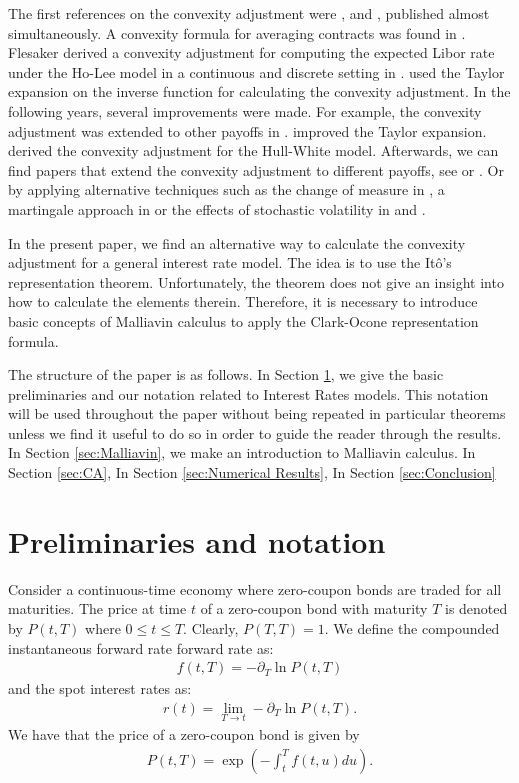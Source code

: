 \documentclass[a4paper,10pt]{article}
\newcommand{\1}{\mathbf{1}}
\begin{document}
The first references on the convexity adjustment were \cite{RitchkenS}, \cite{Flesaker} and \cite{BrothertonIben}, published almost simultaneously. A convexity formula for averaging contracts was found in \cite{RitchkenS}. Flesaker derived a convexity adjustment for computing the expected Libor rate under the Ho-Lee model in a continuous and discrete setting in \cite{Flesaker}. \cite{BrothertonIben} used the Taylor expansion on the inverse function for calculating the convexity adjustment. In the following years, several improvements were made. For example, the convexity adjustment was extended to other payoffs in \cite{Hull06}. \cite{Hart} improved the Taylor expansion. \cite{KirikosNovak} derived the convexity adjustment for the Hull-White model. Afterwards, we can find papers that extend the convexity adjustment to different payoffs, see \cite{Benhamou00WC} or \cite{Hagan03}. Or by applying alternative techniques such as the change of measure in \cite{Pelsser}, a martingale approach in \cite{Benhamou00} or the effects of stochastic volatility in \cite{PiterbargRenedo} and \cite{HaganWoodward20}.

In the present paper, we find an alternative way to calculate the convexity adjustment for a general interest rate model. The idea is to use the It\^o's representation theorem. Unfortunately, the theorem does not give an insight into how to calculate the elements therein. Therefore, it is necessary to introduce basic concepts of Malliavin calculus to apply the Clark-Ocone representation formula.


The structure of the paper is as follows. In Section \ref{sec:Notation}, we give the basic preliminaries and our notation related to Interest Rates models. This notation will be used throughout the paper without being repeated in particular theorems unless we find it useful to do so in order to guide the reader through the results. In Section \ref{sec:Malliavin}, we make an introduction to Malliavin calculus. In Section \ref{sec:CA}, In Section \ref{sec:Numerical Results}, In Section \ref{sec:Conclusion}


\section{Preliminaries and notation}\label{sec:Notation}
Consider a continuous-time economy where zero-coupon bonds are traded for all maturities. The price at time $t$ of a zero-coupon bond with maturity $T$ is denoted by $P(t,T)$ where $0\leq t \leq T$. Clearly, $P(T,T)=1$. We define the compounded instantaneous forward rate forward rate as:
\begin{eqnarray*}
f(t,T)= -\partial_{T}\ln P(t,T)
\end{eqnarray*}
and the spot interest rates as:
\begin{eqnarray*}
r(t)=\lim_{T\longrightarrow t} -\partial_{T}\ln P(t,T).
\end{eqnarray*}
We have that the price of a zero-coupon bond is given by
\begin{eqnarray*}
P(t,T)=\exp\left(-\int^{T}_{t} f(t,u) du\right).
\end{eqnarray*}
\end{document}
